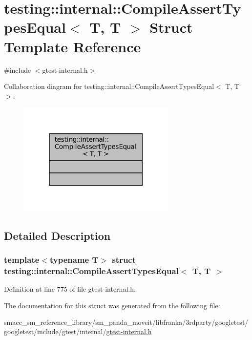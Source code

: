 \hypertarget{structtesting_1_1internal_1_1CompileAssertTypesEqual_3_01T_00_01T_01_4}{}\section{testing\+:\+:internal\+:\+:Compile\+Assert\+Types\+Equal$<$ T, T $>$ Struct Template Reference}
\label{structtesting_1_1internal_1_1CompileAssertTypesEqual_3_01T_00_01T_01_4}


{\ttfamily \#include $<$gtest-\/internal.\+h$>$}



Collaboration diagram for testing\+:\+:internal\+:\+:Compile\+Assert\+Types\+Equal$<$ T, T $>$\+:
\nopagebreak
\begin{figure}[H]
\begin{center}
\leavevmode
\includegraphics[width=223pt]{structtesting_1_1internal_1_1CompileAssertTypesEqual_3_01T_00_01T_01_4__coll__graph}
\end{center}
\end{figure}


\subsection{Detailed Description}
\subsubsection*{template$<$typename T$>$\newline
struct testing\+::internal\+::\+Compile\+Assert\+Types\+Equal$<$ T, T $>$}



Definition at line 775 of file gtest-\/internal.\+h.



The documentation for this struct was generated from the following file\+:\begin{DoxyCompactItemize}
\item 
smacc\+\_\+sm\+\_\+reference\+\_\+library/sm\+\_\+panda\+\_\+moveit/libfranka/3rdparty/googletest/googletest/include/gtest/internal/\hyperlink{gtest-internal_8h}{gtest-\/internal.\+h}\end{DoxyCompactItemize}

